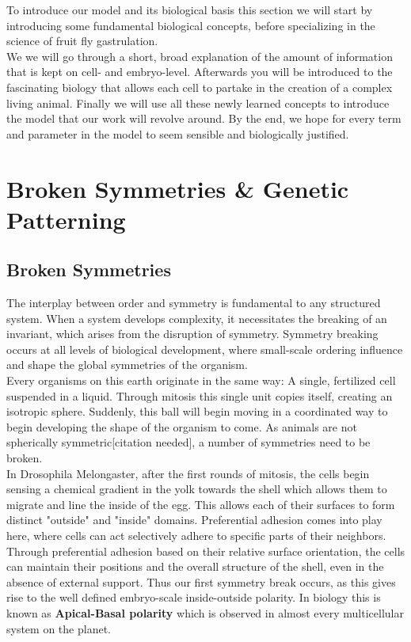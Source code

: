To introduce our model and its biological basis this section we will start by introducing some fundamental biological concepts, before specializing in the science of fruit fly gastrulation. \\
We we will go through a short, broad explanation of the amount of information that is kept on cell- and embryo-level. Afterwards you will be introduced to the fascinating biology that allows each cell to partake in the creation of a complex living animal. Finally we will use all these newly learned concepts to introduce the model that our work will revolve around. By the end, we hope for every term and parameter in the model to seem sensible and biologically justified. 


\section{\hspace{-0.2cm}Broken Symmetries \& Genetic Patterning}
\label{sec:theory-polarity}
\subsection{Broken Symmetries}
The interplay between order and symmetry is fundamental to any structured system. When a system develops complexity, it necessitates the breaking of an invariant, which arises from the disruption of symmetry.\cite{anderson1972more}
Symmetry breaking occurs at all levels of biological development, where small-scale ordering influence and shape the global symmetries of the organism. \\

Every organisms on this earth originate in the same way: A single, fertilized cell suspended in a liquid. Through mitosis this single unit copies itself,  creating an isotropic sphere. Suddenly, this ball will begin moving in a coordinated way to begin developing the shape of the organism to come. As animals are not spherically symmetric[citation needed], a number of symmetries need to be broken. \\

In Drosophila Melongaster, after the first rounds of mitosis, the cells begin sensing a chemical gradient in the yolk towards the shell which allows them to migrate and line the inside of the egg. This allows each of their surfaces to form distinct "outside" and "inside" domains. 
Preferential adhesion comes into play here, where cells can act selectively adhere to specific parts of their neighbors. 
Through preferential adhesion based on their relative surface orientation, the cells can maintain their positions and the overall structure of the shell, even in the absence of external support.
Thus our first symmetry break occurs, as this gives rise to the well defined embryo-scale inside-outside polarity. In biology this is known as \textbf{Apical-Basal polarity} which is observed in almost every multicellular system on the planet.\\

